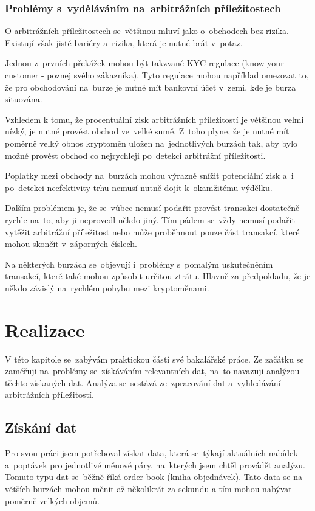 \documentclass[thesis=B,czech]{FITthesis}[2019/03/21]
\begin{document}
\subsection{Problémy s~vyděláváním na~arbitrážních příležitostech}
O arbitrážních příležitostech se~většinou mluví jako o~obchodech bez rizika. Existují však jisté bariéry a~rizika, která je nutné brát v~potaz.

Jednou z~prvních překážek mohou být takzvané KYC regulace (know your customer - poznej svého zákazníka). Tyto regulace mohou například omezovat to, že pro obchodování na~burze je nutné mít bankovní účet v~zemi, kde je burza situována.

Vzhledem k tomu, že procentuální zisk arbitrážních příležitostí je většinou velmi nízký, je nutné provést obchod ve~velké sumě. Z~toho plyne, že je nutné mít poměrně velký obnos kryptoměn uložen na~jednotlivých burzách tak, aby bylo možné provést obchod co nejrychleji po~detekci arbitrážní příležitosti. 

Poplatky mezi obchody na~burzách mohou výrazně snížit potenciální zisk a~i po~detekci neefektivity trhu nemusí nutně dojít k~okamžitému výdělku.  

Dalším problémem je, že se~vůbec nemusí podařit provést transakci dostatečně rychle na~to, aby ji neprovedl někdo jiný. Tím pádem se~vždy nemusí podařit vytěžit arbitrážní příležitost nebo může proběhnout pouze část transakcí, které mohou skončit v~záporných číslech.

Na některých burzách se~objevují i~problémy s~pomalým uskutečněním transakcí, které také mohou způsobit určitou ztrátu. Hlavně za předpokladu, že je někdo závislý na~rychlém pohybu mezi kryptoměnami. \cite{finder}

\chapter{Realizace}
V této kapitole se~zabývám praktickou částí své bakalářské práce. Ze začátku se zaměřuji na~problémy se~získáváním relevantních dat, na~to navazuji analýzou těchto získaných dat. Analýza se~sestává ze~zpracování dat a~vyhledávání arbitrážních příležitostí.

\section{Získání dat}
Pro svou práci jsem potřeboval získat data, která se~týkají aktuálních nabídek a~poptávek pro jednotlivé měnové páry, na~kterých jsem chtěl provádět analýzu. Tomuto typu dat se~běžně říká order book (kniha objednávek). Tato data se na větších burzách mohou měnit až několikrát za sekundu a tím mohou nabývat poměrně velkých objemů. 
\end{document}
